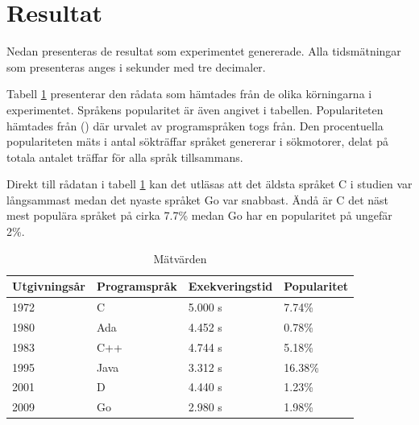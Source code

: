 \documentclass[12pt,swedish]{article}
\begin{document}
\newpage
\section{Resultat}
Nedan presenteras de resultat som experimentet genererade. Alla tidsmätningar som presenteras anges i sekunder med tre decimaler.

\begin{table}[H]
Tabell \ref{table:result} presenterar den rådata som hämtades från de olika körningarna i experimentet. Språkens popularitet är även angivet i tabellen. Populariteten hämtades från  (\citeyear{tiobe}) där urvalet av programspråken togs från. Den procentuella populariteten mäts i antal sökträffar språket genererar i sökmotorer, delat på totala antalet träffar för alla språk tillsammans.

Direkt till rådatan i tabell \ref{table:result} kan det utläsas att det äldsta språket C i studien var långsammast medan det nyaste språket Go var snabbast. Ändå är C det näst mest populära språket på cirka 7.7\% medan Go har en popularitet på ungefär 2\%.
\begin{center}
\caption{Mätvärden}
\label{table:result}
\begin{tabular}{@{}llll@{}}
\toprule
Utgivningsår & Programspråk & Exekveringstid & Popularitet \\ \midrule
1972         & C            & 5.000 s        & 7.74\%      \\
1980         & Ada          & 4.452 s        & 0.78\%      \\
1983         & C++          & 4.744 s        & 5.18\%      \\
1995         & Java         & 3.312 s        & 16.38\%     \\
2001         & D            & 4.440 s        & 1.23\%      \\
2009         & Go           & 2.980 s        & 1.98\%      \\ \bottomrule
\end{tabular}
\end{center}
\end{table}
\end{document}
